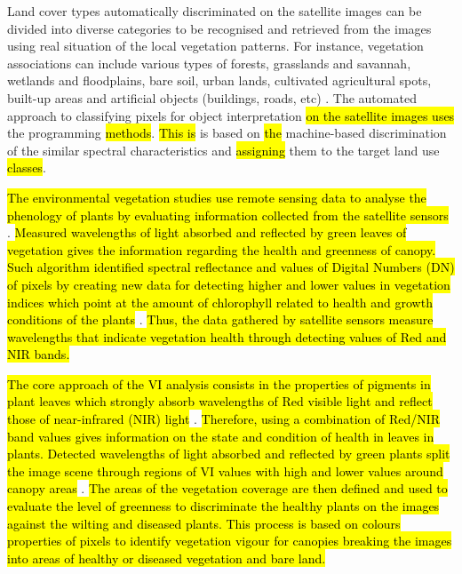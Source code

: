 \documentclass[12pt,a4paper,oneside]{article}
\def \newpar{\vspace{6pt}}
\begin{document}
\newpar Land cover types automatically discriminated on the satellite images can be divided into diverse categories to be recognised and retrieved from the images using real situation of the local vegetation patterns. For instance, vegetation associations can include various types of forests, grasslands and savannah, wetlands and floodplains, bare soil, urban lands, cultivated agricultural spots, built-up areas and artificial objects (buildings, roads, etc) \citep{lillesand1994remote}. The automated approach to classifying pixels for object interpretation \hl{on the satellite images uses} the programming \hl{methods}. \hl{This is }is based on \hl{the }machine-based discrimination of the similar spectral characteristics and \hl{assigning} them to the target land use \hl{classes}.

\newpar \hl{The environmental vegetation studies use remote sensing data to analyse the phenology of plants by evaluating information collected from the satellite sensors} \cite{rs9050463,rs9050485}. \hl{Measured wavelengths of light absorbed and reflected by green leaves of vegetation gives the information regarding the health and greenness of canopy. Such algorithm identified spectral reflectance and values of Digital Numbers (DN) of pixels by creating new data for detecting higher and lower values in vegetation indices which point at the amount of chlorophyll related to health and growth conditions of the plants} \citep{jmse11040871,jimaging9050093}.\hl{ Thus, the data gathered by satellite sensors measure wavelengths that indicate vegetation health through detecting values of Red and NIR bands.}

\newpar \hl{The core approach of the VI analysis consists in the properties of pigments in plant leaves which strongly absorb wavelengths of Red visible light and reflect those of near-infrared (NIR) light} \cite{rs9050472}. \hl{Therefore, using a combination of Red/NIR  band values gives information on the state and condition of health in leaves in plants. Detected wavelengths of light absorbed and reflected by green plants split the image scene through regions of VI values with high and lower values around canopy areas} \cite{agronomy9050226,jimaging9050098}. \hl{The areas of the vegetation coverage are then defined and used to evaluate the level of greenness to discriminate the healthy plants on the images against the wilting and diseased plants. This process is based on colours properties of pixels to identify vegetation vigour for canopies breaking the images into areas of healthy or diseased vegetation and bare land.} 
\end{document}
